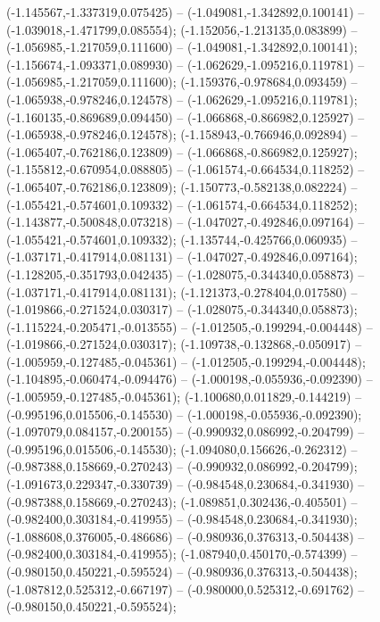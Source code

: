  (-1.145567,-1.337319,0.075425) -- (-1.049081,-1.342892,0.100141) -- (-1.039018,-1.471799,0.085554);
 (-1.152056,-1.213135,0.083899) -- (-1.056985,-1.217059,0.111600) -- (-1.049081,-1.342892,0.100141);
 (-1.156674,-1.093371,0.089930) -- (-1.062629,-1.095216,0.119781) -- (-1.056985,-1.217059,0.111600);
 (-1.159376,-0.978684,0.093459) -- (-1.065938,-0.978246,0.124578) -- (-1.062629,-1.095216,0.119781);
 (-1.160135,-0.869689,0.094450) -- (-1.066868,-0.866982,0.125927) -- (-1.065938,-0.978246,0.124578);
 (-1.158943,-0.766946,0.092894) -- (-1.065407,-0.762186,0.123809) -- (-1.066868,-0.866982,0.125927);
 (-1.155812,-0.670954,0.088805) -- (-1.061574,-0.664534,0.118252) -- (-1.065407,-0.762186,0.123809);
 (-1.150773,-0.582138,0.082224) -- (-1.055421,-0.574601,0.109332) -- (-1.061574,-0.664534,0.118252);
 (-1.143877,-0.500848,0.073218) -- (-1.047027,-0.492846,0.097164) -- (-1.055421,-0.574601,0.109332);
 (-1.135744,-0.425766,0.060935) -- (-1.037171,-0.417914,0.081131) -- (-1.047027,-0.492846,0.097164);
 (-1.128205,-0.351793,0.042435) -- (-1.028075,-0.344340,0.058873) -- (-1.037171,-0.417914,0.081131);
 (-1.121373,-0.278404,0.017580) -- (-1.019866,-0.271524,0.030317) -- (-1.028075,-0.344340,0.058873);
 (-1.115224,-0.205471,-0.013555) -- (-1.012505,-0.199294,-0.004448) -- (-1.019866,-0.271524,0.030317);
 (-1.109738,-0.132868,-0.050917) -- (-1.005959,-0.127485,-0.045361) -- (-1.012505,-0.199294,-0.004448);
 (-1.104895,-0.060474,-0.094476) -- (-1.000198,-0.055936,-0.092390) -- (-1.005959,-0.127485,-0.045361);
 (-1.100680,0.011829,-0.144219) -- (-0.995196,0.015506,-0.145530) -- (-1.000198,-0.055936,-0.092390);
 (-1.097079,0.084157,-0.200155) -- (-0.990932,0.086992,-0.204799) -- (-0.995196,0.015506,-0.145530);
 (-1.094080,0.156626,-0.262312) -- (-0.987388,0.158669,-0.270243) -- (-0.990932,0.086992,-0.204799);
 (-1.091673,0.229347,-0.330739) -- (-0.984548,0.230684,-0.341930) -- (-0.987388,0.158669,-0.270243);
 (-1.089851,0.302436,-0.405501) -- (-0.982400,0.303184,-0.419955) -- (-0.984548,0.230684,-0.341930);
 (-1.088608,0.376005,-0.486686) -- (-0.980936,0.376313,-0.504438) -- (-0.982400,0.303184,-0.419955);
 (-1.087940,0.450170,-0.574399) -- (-0.980150,0.450221,-0.595524) -- (-0.980936,0.376313,-0.504438);
 (-1.087812,0.525312,-0.667197) -- (-0.980000,0.525312,-0.691762) -- (-0.980150,0.450221,-0.595524);
